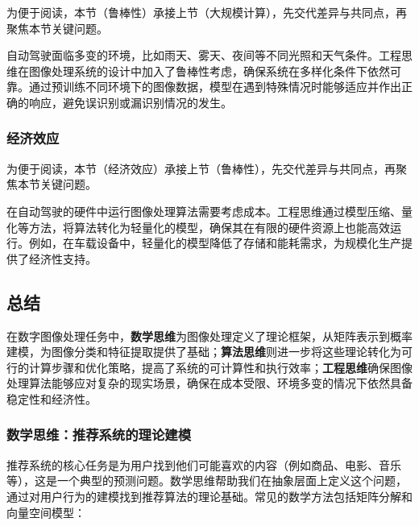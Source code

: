 为便于阅读，本节（鲁棒性）承接上节（大规模计算），先交代差异与共同点，再聚焦本节关键问题。

自动驾驶面临多变的环境，比如雨天、雾天、夜间等不同光照和天气条件。工程思维在图像处理系统的设计中加入了鲁棒性考虑，确保系统在多样化条件下依然可靠。通过预训练不同环境下的图像数据，模型在遇到特殊情况时能够适应并作出正确的响应，避免误识别或漏识别情况的发生。
\subsubsection*{经济效应}


为便于阅读，本节（经济效应）承接上节（鲁棒性），先交代差异与共同点，再聚焦本节关键问题。

在自动驾驶的硬件中运行图像处理算法需要考虑成本。工程思维通过模型压缩、量化等方法，将算法转化为轻量化的模型，确保其在有限的硬件资源上也能高效运行。例如，在车载设备中，轻量化的模型降低了存储和能耗需求，为规模化生产提供了经济性支持。
\subsection{  总结}



在数字图像处理任务中，{\bf 数学思维}为图像处理定义了理论框架，从矩阵表示到概率建模，为图像分类和特征提取提供了基础；{\bf 算法思维}则进一步将这些理论转化为可行的计算步骤和优化策略，提高了系统的可计算性和执行效率；{\bf 工程思维}确保图像处理算法能够应对复杂的现实场景，确保在成本受限、环境多变的情况下依然具备稳定性和经济性。

\subsubsection{ 数学思维：推荐系统的理论建模}


推荐系统的核心任务是为用户找到他们可能喜欢的内容（例如商品、电影、音乐等），这是一个典型的预测问题。数学思维帮助我们在抽象层面上定义这个问题，通过对用户行为的建模找到推荐算法的理论基础。常见的数学方法包括矩阵分解和向量空间模型：
